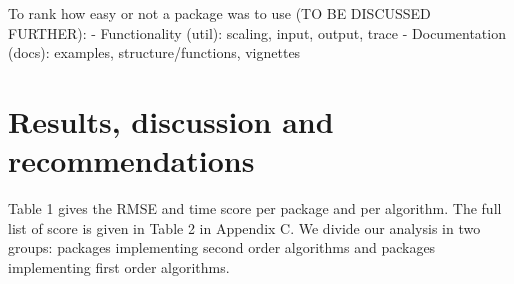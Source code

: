 To rank how easy or not a package was to use (TO BE DISCUSSED FURTHER):
- Functionality (util): scaling, input, output, trace - Documentation
(docs): examples, structure/functions, vignettes

\hypertarget{results-discussion-and-recommendations}{%
\section{Results, discussion and
recommendations}\label{results-discussion-and-recommendations}}

Table 1 gives the RMSE and time score per package and per algorithm. The
full list of score is given in Table 2 in Appendix C. We divide our
analysis in two groups: packages implementing second order algorithms
and packages implementing first order algorithms.


